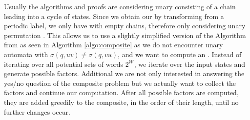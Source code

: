 Usually the algorithms and proofs are considering unary \DFAs consisting of a chain leading into a cycle of states.
Since we obtain our \DFAs by transforming from a periodic label, we only have \DFAs with empty chains, therefore only considering unary permutation \DFA.
This allows us to use a slightly simplified version of the Algorithm from \cite{DBLP:journals/corr/abs-2107-04683} as seen in Algorithm \ref{algo:composite} as we do not encounter unary automata with $\sigma(q, uv) \not = \sigma(q, vu)$, and we want to compute an \orDecomp.
Instead of iterating over all potential sets of words $2^\mathcal{W}$, we iterate over the input states and generate possible factors.
Additional we are not only interested in answering the yes/no question of the composite problem but we actually want to collect the factors and continue our computation.
After all possible factors are computed, they are added greedily to the composite, in the order of their length, until no further changes occur.

